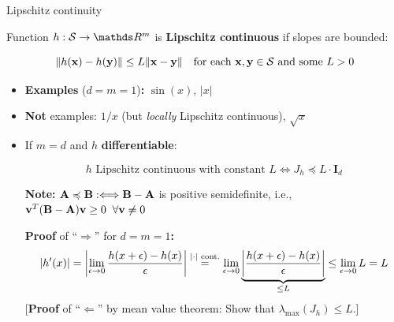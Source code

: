 \documentclass[11pt,compress,t,notes=noshow, xcolor=table]{beamer}
\begin{document}
\begin{vbframe}{Lipschitz continuity}

\vspace{-\baselineskip}

\begin{kframe}
    Function $h : \mathcal{S} \to \R^m$ is \textbf{Lipschitz continuous} if slopes are bounded:

    \vspace{-1.25\baselineskip}
    
    \begin{equation*}
        \|h(\mathbf{x}) - h(\mathbf{y})\| \leq L \|\mathbf{x} - \mathbf{y}\| \quad \text{for each $\mathbf{x},\mathbf{y}\in\mathcal{S}$ and some~$L>0$}
    \end{equation*}
\end{kframe}

\begin{itemize}
    \item \textbf{Examples} ($d=m=1$)\textbf{:} $\sin(x)$, $|x|$
    \item \textbf{Not} examples: $1/x$ (but \textit{locally} Lipschitz continuous), $\sqrt{x}$
    \item If $m=d$ and $h$ \textbf{differentiable}:
        
        \vspace{-0.5\baselineskip}
        
        \begin{kframe}
            \vspace{-0.3\baselineskip}
            \begin{equation*}
                \text{$h$ Lipschitz continuous with constant $L$} \Longleftrightarrow J_h \preccurlyeq L \cdot \mathbf{I}_d
            \end{equation*}
        \end{kframe}
        
        \begin{footnotesize}
            \textbf{Note:} $\mathbf{A} \preccurlyeq \mathbf{B} :\Longleftrightarrow \mathbf{B} - \mathbf{A}$ is positive semidefinite, i.e., $\mathbf{v}^T(\mathbf{B} - \mathbf{A})\mathbf{v} \geq 0 \;\; \forall \mathbf{v} \neq 0$

            \medskip
            
            \textbf{Proof} of \enquote{$\Rightarrow$} for $d=m=1$\textbf{:}
            \begin{equation*}
                |h'(x)| = \left| \lim_{\epsilon\to0} \frac{h(x+\epsilon)-h(x)}{\epsilon} \right| \overset{\text{|$\cdot$| cont.}}{=} \lim_{\epsilon\to0}\underbrace{\left|\frac{h(x+\epsilon)-h(x)}{\epsilon}\right|}_{\leq L} \leq \lim_{\epsilon\to0}L = L
            \end{equation*}
            [\textbf{Proof} of \enquote{$\Leftarrow$} by mean value theorem: Show that $\lambda_\text{max}(J_h) \leq L$.]
        \end{footnotesize}
\end{itemize}

\end{vbframe}
\end{document}
